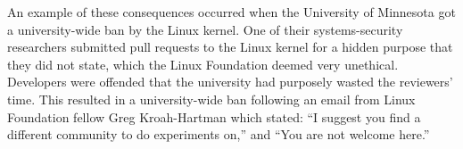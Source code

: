 An example of these consequences occurred when the University of Minnesota got a university-wide ban by the Linux kernel. One of their systems-security researchers submitted pull requests to the Linux kernel for a hidden purpose that they did not state, which the Linux Foundation deemed very unethical. Developers were offended that the university had purposely wasted the reviewers' time. This resulted in a university-wide ban following an email from Linux Foundation fellow Greg Kroah-Hartman which stated: ``I suggest you find a different community to do experiments on,'' and ``You are not welcome here.''~\cite{minnesota_banned}
